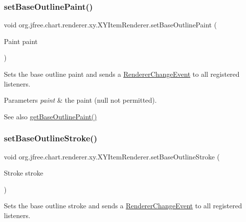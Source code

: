 \subsubsection{\texorpdfstring{set\+Base\+Outline\+Paint()}{setBaseOutlinePaint()}}
{\footnotesize\ttfamily void org.\+jfree.\+chart.\+renderer.\+xy.\+X\+Y\+Item\+Renderer.\+set\+Base\+Outline\+Paint (\begin{DoxyParamCaption}\item[{Paint}]{paint }\end{DoxyParamCaption})}

Sets the base outline paint and sends a \mbox{\hyperlink{}{Renderer\+Change\+Event}} to all registered listeners.


\begin{DoxyParams}{Parameters}
{\em paint} & the paint ({\ttfamily null} not permitted).\\
\hline
\end{DoxyParams}
\begin{DoxySeeAlso}{See also}
\mbox{\hyperlink{interfaceorg_1_1jfree_1_1chart_1_1renderer_1_1xy_1_1_x_y_item_renderer_a3b0b7659139c245b83ce5436885c1bde}{get\+Base\+Outline\+Paint()}} 
\end{DoxySeeAlso}
\mbox{\label{interfaceorg_1_1jfree_1_1chart_1_1renderer_1_1xy_1_1_x_y_item_renderer_aab77837ee355fecff3b20d5559727bf3}} 
\subsubsection{\texorpdfstring{set\+Base\+Outline\+Stroke()}{setBaseOutlineStroke()}}
{\footnotesize\ttfamily void org.\+jfree.\+chart.\+renderer.\+xy.\+X\+Y\+Item\+Renderer.\+set\+Base\+Outline\+Stroke (\begin{DoxyParamCaption}\item[{Stroke}]{stroke }\end{DoxyParamCaption})}

Sets the base outline stroke and sends a \mbox{\hyperlink{}{Renderer\+Change\+Event}} to all registered listeners.


